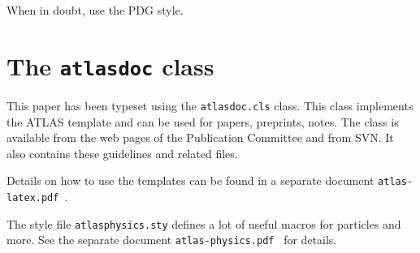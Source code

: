 \documentclass[UKenglish]{latex/atlasdoc}
\begin{document}
When in doubt, use the PDG style.


\section{The \texttt{atlasdoc} class}
\label{sec:atlasdoc}

This paper has been typeset using the \texttt{atlasdoc.cls} class.
This class implements the ATLAS template and can be used for papers, preprints,
notes. The class is available from the web pages of the
Publication Committee and from SVN.
It also contains these guidelines and related files.

Details on how to use the templates can be found in a separate document
\texttt{atlas-latex.pdf}~\cite{atlas-latex}.

The style file \texttt{atlasphysics.sty} defines a lot of useful
macros for particles and more. See the separate document
\texttt{atlas-physics.pdf}~\cite{atlas-physics} for details.
\end{document}
